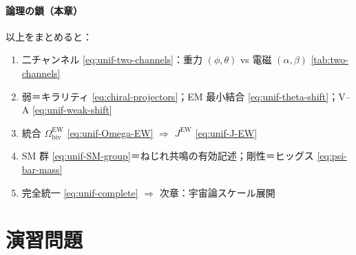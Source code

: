 \documentclass[dvipdfmx,a4paper,oneside]{jsbook}
\numberwithin{equation}{chapter}
\begin{document}
\paragraph{論理の鎖（本章）}
以上をまとめると：
\begin{enumerate}[leftmargin=2em]
  \item 二チャンネル \eqref{eq:unif-two-channels}：重力 \((\phi,\theta)\) vs 電磁 \((\alpha,\beta)\) \eqref{tab:two-channels}
  \item 弱＝キラリティ \eqref{eq:chiral-projectors}；EM 最小結合 \eqref{eq:unif-theta-shift}；V--A \eqref{eq:unif-weak-shift}
  \item 統合 \(\Omega_{\mathrm{biv}}^{\mathrm{EW}}\) \eqref{eq:unif-Omega-EW} \(\Rightarrow\) \(J^{\mathrm{EW}}\) \eqref{eq:unif-J-EW}
  \item SM 群 \eqref{eq:unif-SM-group}＝ねじれ共鳴の有効記述；剛性＝ヒッグス \eqref{eq:psi-bar-mass}
  \item 完全統一 \eqref{eq:unif-complete} \(\Rightarrow\) 次章：宇宙論スケール展開
\end{enumerate}

\section*{演習問題}
\end{document}
